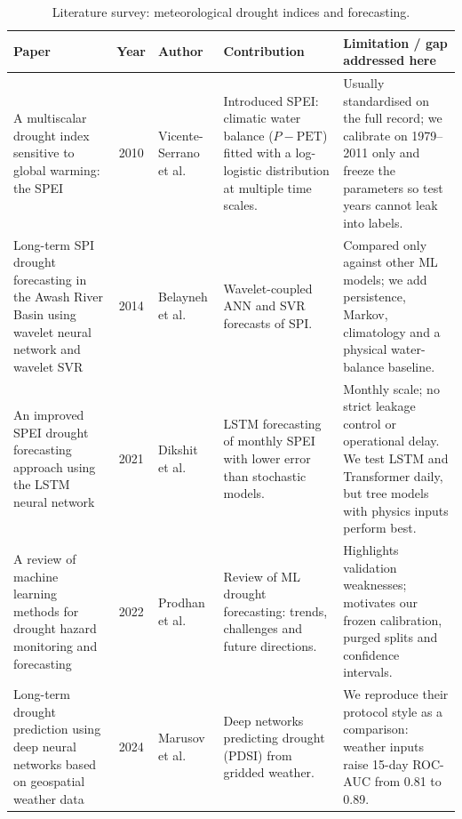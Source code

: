 \documentclass[11pt,a4paper,oneside]{article}
\renewcommand{\arraystretch}{1.0}
\begin{document}
\begin{table}[H]
\centering
\caption{Literature survey: meteorological drought indices and forecasting.}
\label{tab:lit_weather}
\scriptsize
\renewcommand{\arraystretch}{1.05}
\begin{tabularx}{\textwidth}{@{}p{3.1cm}|c|p{2.2cm}|X|X@{}}
\hline
\textbf{Paper} & \textbf{Year} & \textbf{Author} & \textbf{Contribution} & \textbf{Limitation / gap addressed here} \\
\hline
A multiscalar drought index sensitive to global warming: the SPEI~\cite{vicente2010} & 2010 & Vicente-Serrano et al. & Introduced SPEI: climatic water balance ($P-\mathrm{PET}$) fitted with a log-logistic distribution at multiple time scales. & Usually standardised on the full record; we calibrate on 1979--2011 only and freeze the parameters so test years cannot leak into labels. \\
\hline
Long-term SPI drought forecasting in the Awash River Basin using wavelet neural network and wavelet SVR~\cite{belayneh2014} & 2014 & Belayneh et al. & Wavelet-coupled ANN and SVR forecasts of SPI. & Compared only against other ML models; we add persistence, Markov, climatology and a physical water-balance baseline. \\
\hline
An improved SPEI drought forecasting approach using the LSTM neural network~\cite{dikshit2021} & 2021 & Dikshit et al. & LSTM forecasting of monthly SPEI with lower error than stochastic models. & Monthly scale; no strict leakage control or operational delay. We test LSTM and Transformer daily, but tree models with physics inputs perform best. \\
\hline
A review of machine learning methods for drought hazard monitoring and forecasting~\cite{prodhan2022} & 2022 & Prodhan et al. & Review of ML drought forecasting: trends, challenges and future directions. & Highlights validation weaknesses; motivates our frozen calibration, purged splits and confidence intervals. \\
\hline
Long-term drought prediction using deep neural networks based on geospatial weather data~\cite{marusov2024} & 2024 & Marusov et al. & Deep networks predicting drought (PDSI) from gridded weather. & We reproduce their protocol style as a comparison: weather inputs raise 15-day ROC-AUC from 0.81 to 0.89. \\
\hline
\end{tabularx}
\end{table}
\end{document}
